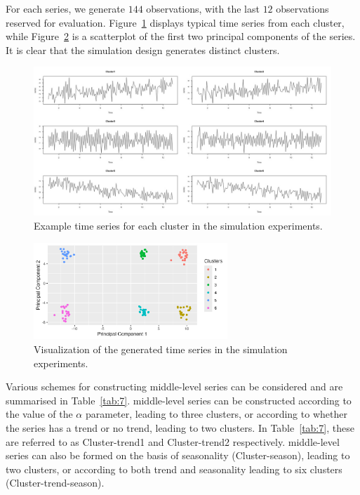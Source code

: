 \documentclass[a4paper,review,12pt,authoryear]{elsarticle}
\begin{document}
For each series, we generate $144$ observations, with the last $12$ observations reserved for evaluation. Figure~\ref{fig:simu_emps} displays typical time series from each cluster, while Figure~\ref{fig:simu_pca} is a scatterplot of the first two principal components of the series. It is clear that the simulation design generates distinct clusters.

\begin{figure}[!h]
\centering
\includegraphics[width=\textwidth]{../figures/Figure9.jpg}
\caption{\label{fig:simu_emps}Example time series for each cluster in the simulation experiments.}
\end{figure}

\begin{figure}[!h]
    \centering
    \includegraphics[width=0.65\textwidth]{../figures/Figure8.jpg}
    \caption{\label{fig:simu_pca}Visualization of the generated time series in the simulation experiments.}
\end{figure}






Various schemes for constructing middle-level series can be considered and are summarised in Table~\ref{tab:7}. middle-level series can be constructed according to the value of the $\alpha$ parameter, leading to three clusters, or according to whether the series has a trend or no trend, leading to two clusters. In Table~\ref{tab:7}, these are referred to as Cluster-trend1 and Cluster-trend2 respectively. middle-level series can also be formed on the basis of seasonality (Cluster-season), leading to two clusters, or according to both trend and seasonality leading to six clusters (Cluster-trend-season).
\end{document}
